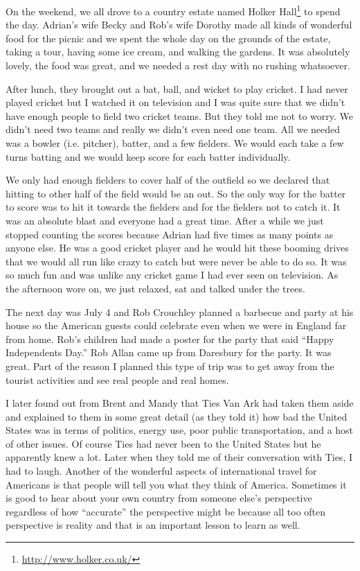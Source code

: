 \documentclass[12pt]{book}
\begin{document}
On the weekend, we all drove to a country estate named
Holker Hall\footnote{\url{http://www.holker.co.uk/}}
to spend the day.
Adrian's wife Becky and Rob's wife Dorothy made all kinds of
wonderful food for the picnic and
we spent the whole day on the grounds of the estate, taking
a tour, having some ice cream, and walking the gardens.
It was absolutely lovely, the food was great, and we needed
a rest day with no rushing whatsoever.

After lunch, they brought out a bat, ball, and wicket
to play cricket.  I had never played cricket but I watched it on television
and I was quite sure that we didn't have enough people to field two
cricket teams.  But they told me not to worry.  We didn't need two teams
and really we didn't even need one team.  All we needed was a bowler
(i.e. pitcher), batter, and a few fielders.  We would each take a few
turns batting and we would keep score for each batter individually.

We only had enough fielders to cover half of the outfield so we
declared that hitting to other half of the field would be an out.
So the only way for the batter to score was to hit it towards the
fielders and for the fielders
not to catch it.  It was an absolute blast and everyone had a great time.
After a while we just stopped counting the scores because Adrian had
five times as many points as anyone else.  He was a good cricket player
and he would hit these booming drives that we would all run like crazy
to catch but were never be able to do so.   It was so much fun and
was unlike any cricket game I had ever seen on television.  As the
afternoon wore on, we just relaxed, sat and talked under the trees.

The next day was July 4 and Rob Crouchley planned a barbecue and party
at his house so the American guests could celebrate even when we were
in England far from home.  Rob's children had made a poster for the
party that said ``Happy Independents Day.''  Rob Allan came
up from Daresbury for the party.  It was great.
Part of the reason I planned this type of trip was to
get away from the tourist activities and see real people and real homes.

I later found out from Brent and Mandy that Ties Van Ark had taken them
aside and explained to them in some great detail (as they told it) how
bad the United States was in terms of politics, energy use, poor public
transportation, and a host of other issues.  Of course Ties had never been
to the United States but he apparently knew a lot.  Later when they
told me of their conversation with Ties, I had to laugh.  Another of
the wonderful aspects of international travel for Americans is that
people will tell you what they think of America.  Sometimes it is good
to hear about your own country from someone else's perspective
regardless of how ``accurate'' the perspective might be because
all too often perspective is reality and that is an important lesson
to learn as well.
\end{document}
